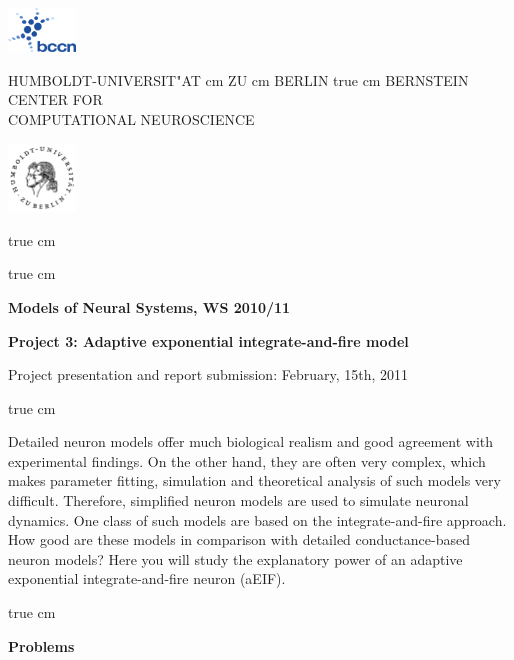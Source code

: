\documentclass[12pt]{article}
\begin{document}
\parbox{2cm}{
\includegraphics[width=1.8cm]{../bccnlogo.pdf}
}
\parbox{11cm}{
\begin{center}
\large HUMBOLDT-UNIVERSIT"AT  cm ZU  cm BERLIN
 true cm
\mgross BERNSTEIN CENTER FOR\\ COMPUTATIONAL NEUROSCIENCE
\end{center}
}
\parbox{2cm}
{
\hfill
\includegraphics[width=1.8cm]{../hublogo.pdf}
}

 true cm



 true cm
\centerline{\bf Models of Neural Systems, WS 2010/11}
\centerline{\bf Project 3: Adaptive exponential integrate-and-fire
model} 
\centerline{Project presentation and report submission: February,
15th, 2011}

 true cm


Detailed neuron models offer much biological realism and good
agreement with experimental findings. On the other hand, they are often
very complex, which makes parameter fitting, simulation and theoretical
analysis of such models very difficult. Therefore, simplified
neuron models are used to simulate neuronal dynamics. One class of such
models are based on the integrate-and-fire approach. How good are these
models in comparison with detailed conductance-based neuron models?
Here you will study the explanatory power of an adaptive exponential
integrate-and-fire neuron (aEIF).

 true cm

{\bf Problems}
\end{document}
